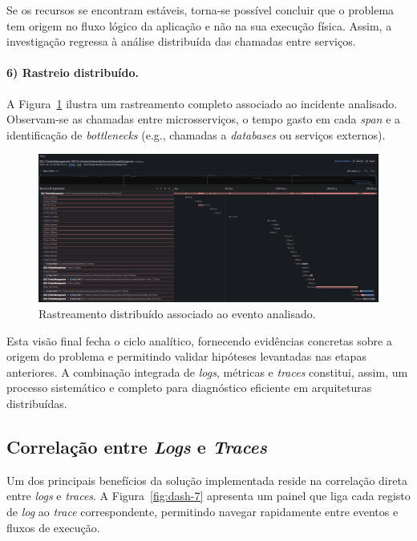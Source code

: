 Se os recursos se encontram estáveis, torna-se possível concluir que o problema tem origem no fluxo lógico da aplicação e não na sua execução física. Assim, a investigação regressa à análise distribuída das chamadas entre serviços.



\paragraph{6) Rastreio distribuído.}

A Figura~\ref{fig:dash-6} ilustra um rastreamento completo associado ao incidente analisado. Observam-se as chamadas entre microsserviços, o tempo gasto em cada \textit{span} e a identificação de \textit{bottlenecks} (e.g., chamadas a \textit{databases} ou serviços externos).

\begin{figure}[H]
    \centering
    \includegraphics[width=\textwidth]{images/Grafana/trace_approve.png}
    \caption{Rastreamento distribuído associado ao evento analisado.}
    \label{fig:dash-6}
\end{figure}

Esta visão final fecha o ciclo analítico, fornecendo evidências concretas sobre a origem do problema 
e permitindo validar hipóteses levantadas nas etapas anteriores. A combinação integrada de \textit{logs}, métricas e \textit{traces} constitui, assim, um processo sistemático e completo para diagnóstico eficiente em arquiteturas distribuídas.


\subsection{Correlação entre \textit{Logs} e \textit{Traces}}

Um dos principais benefícios da solução implementada reside na correlação direta entre \textit{logs} 
e \textit{traces}. A Figura~\ref{fig:dash-7} apresenta um painel que liga cada registo de \textit{log} ao 
\textit{trace} correspondente, permitindo navegar rapidamente entre eventos e fluxos de execução.

